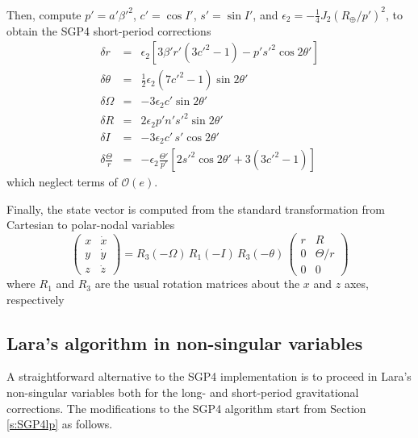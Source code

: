 \documentclass{article}
\begin{document}
Then, compute $p'=a'\beta'^2$, $c'=\cos{I}'$, $s'=\sin{I}'$, and $\epsilon_2=-\frac{1}{4}J_2(R_\oplus/p')^2$, to obtain the SGP4 short-period corrections
\begin{eqnarray*}
\delta r &=& \epsilon_2\left[3\beta'r'(3c'^2-1)-p's'^2\cos2\theta'\right] \\
\delta \theta &=& \frac{1}{2}\epsilon_2(7c'^2-1)\sin{2\theta'} \\
\delta \Omega &=& -3\epsilon_2 c'\sin2\theta' \\
\delta R &=& 2\epsilon_2 p'n's'^2\sin2\theta' \\
\delta I &=& -3\epsilon_2 c'\,s'\cos2\theta' \\
\delta \frac{\Theta}{r} &=&
- \epsilon_2\frac{\Theta'}{p'}\left[2s'^2\cos2\theta'+3\left(3c'^2-1\right)\right]
\end{eqnarray*}
{\color{red}which neglect terms of $\mathcal{O}(e)$}.


Finally, the state vector is computed from the standard transformation from Cartesian to polar-nodal variables
\[ %
\left(\begin{array}{cc} x & \dot{x} \\ y & \dot{y} \\ z & \dot{z} \end{array}\right)=
R_3(-\Omega)\,{R}_1(-I)\,{R}_3(-\theta)\,\left(\begin{array}{cc} r & R \\ 0 & \Theta/r \\ 0 & 0 \end{array}\right)
\] %
where $R_1$ and $R_3$ are the usual rotation matrices about the $x$ and $z$ axes, respectively


\subsection{Lara's algorithm in non-singular variables} \label{sec:lara}

A straightforward alternative to the SGP4 implementation is to proceed in Lara's non-singular variables \cite{Lara2015MPE} both for the long- and short-period gravitational corrections. The modifications to the SGP4 algorithm start from Section \ref{s:SGP4lp} as follows.
\end{document}
